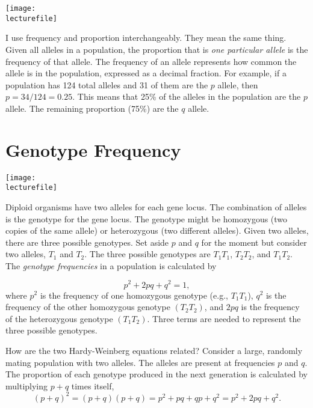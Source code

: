 \documentclass[letterpaper]{tufte-handout}
\newcommand\lecturefile{163_lecture02_fullsize}
\begin{document}
\begin{marginfigure}[0.5in]
	\texttt{[image: \\lecturefile]}
\end{marginfigure}

I use frequency and proportion interchangeably. They mean the same thing.  Given all alleles in a population, the proportion that is \emph{one particular allele} is the frequency of that allele.  The frequency of an allele represents how common the allele is in the population, expressed as a decimal fraction. For example, if a population has 124 total alleles and 31 of them are the $p$ allele, then $p= 34/124 = 0.25$.  This means that 25\% of the alleles in the population are the $p$ allele.  The remaining proportion (75\%) are the $q$ allele.

\section*{Genotype Frequency}

\begin{marginfigure}[0.35in]
	\texttt{[image: \\lecturefile]}
\end{marginfigure}

Diploid organisms have two alleles for each gene locus. The combination of alleles is the genotype for the gene locus. The genotype might be homozygous (two copies of the same allele) or heterozygous (two different alleles).  Given two alleles, there are three possible genotypes. Set aside $p$ and $q$ for the moment but consider two alleles, $T_1$ and $T_2$. The three possible genotypes are $T_1T_1$, $T_2T_2$, and $T_1T_2$.  The \emph{genotype frequencies} in a population is calculated by

\begin{equation*}
p^2 + 2pq+q^2=1,
\end{equation*}
where $p^2$ is the frequency of one homozygous genotype (e.g., $T_1T_1$), $q^2$ is the frequency of the other homozygous genotype $(T_2T_2)$, and $2pq$ is the frequency of the heterozygous genotype $(T_1T_2)$.  Three terms are needed to represent the three possible genotypes. 

How are the two Hardy-Weinberg equations related?  Consider a large, randomly mating population with two alleles.  The alleles are present at frequencies $p$ and $q$.  The proportion of each genotype produced in the next generation is calculated by multiplying $p+q$ times itself,
\begin{equation*}
(p+q)^2=
(p+q)(p+q) =
p^2 + pq + qp + q^2 =
p^2 + 2pq + q^2.
\end{equation*}
\end{document}
